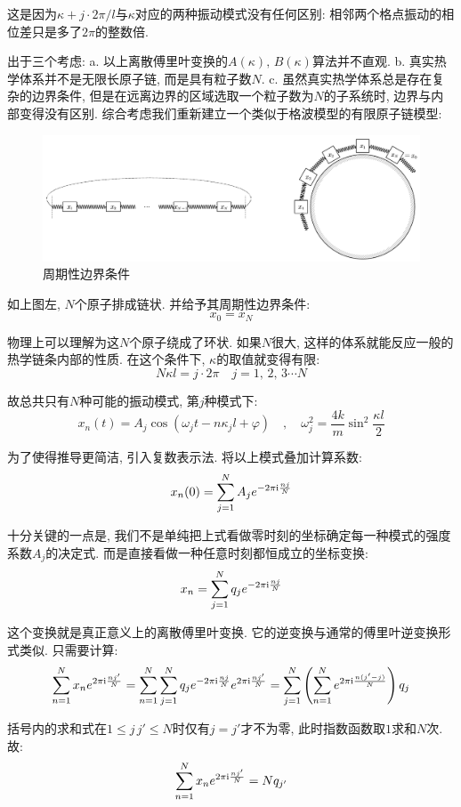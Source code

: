 这是因为$\kappa+j\cdot 2\pi/l$与$\kappa$对应的两种振动模式没有任何区别: 相邻两个格点振动的相位差只是多了$2\pi$的整数倍.

出于三个考虑: a. 以上离散傅里叶变换的$A(\kappa),\,B(\kappa)$算法并不直观. b. 真实热学体系并不是无限长原子链, 而是具有粒子数$N$. c. 虽然真实热学体系总是存在复杂的边界条件, 但是在远离边界的区域选取一个粒子数为$N$的子系统时, 边界与内部变得没有区别. 综合考虑我们重新建立一个类似于格波模型的有限原子链模型:

\begin{figure}[H]
\centering
\includegraphics[width=16cm]{image/5-3-7.png}
\caption{周期性边界条件}
\end{figure}

如上图左, $N$个原子排成链状. 并给予其周期性边界条件:
\[x_0=x_N\]

物理上可以理解为这$N$个原子绕成了环状. 如果$N$很大, 这样的体系就能反应一般的热学链条内部的性质. 在这个条件下, $\kappa$的取值就变得有限:
\[N\kappa l=j\cdot 2\pi\quad j=1,\,2,\,3\cdots N\]

故总共只有$N$种可能的振动模式, 第$j$种模式下:
\[x_n(t)=A_j\cos(\omega_j t-n\kappa_j l+\varphi)\quad ,\quad \omega_j^2=\frac{4k}{m}\sin^2\frac{\kappa l}{2}\]

为了使得推导更简洁, 引入复数表示法. 将以上模式叠加计算系数:
\[x_n(0)=\sum_{j=1}^N A_j e^{-2\pi{\rm i}\frac{nj}{N} }\]

十分关键的一点是, 我们不是单纯把上式看做零时刻的坐标确定每一种模式的强度系数$A_j$的决定式. 而是直接看做一种任意时刻都恒成立的坐标变换:
\[x_n=\sum_{j=1}^N q_j e^{-2\pi{\rm i}\frac{nj}{N}}\]

这个变换就是真正意义上的离散傅里叶变换. 它的逆变换与通常的傅里叶逆变换形式类似. 只需要计算:
\[\sum_{n=1}^N x_n e^{2\pi{\rm i}\frac{nj'}{N}}=\sum_{n=1}^N\sum_{j=1}^N q_j e^{-2\pi{\rm i}\frac{nj}{N}}e^{2\pi{\rm i}\frac{nj'}{N}}=\sum_{j=1}^N\left(\sum_{n=1}^N  e^{2\pi{\rm i}\frac{n(j'-j)}{N}}\right)q_j\]

括号内的求和式在$1\leq j\,j'\leq N$时仅有$j=j'$才不为零, 此时指数函数取$1$求和$N$次. 故:
\[\sum_{n=1}^N x_n e^{2\pi{\rm i}\frac{nj'}{N}}=Nq_{j'}\]

